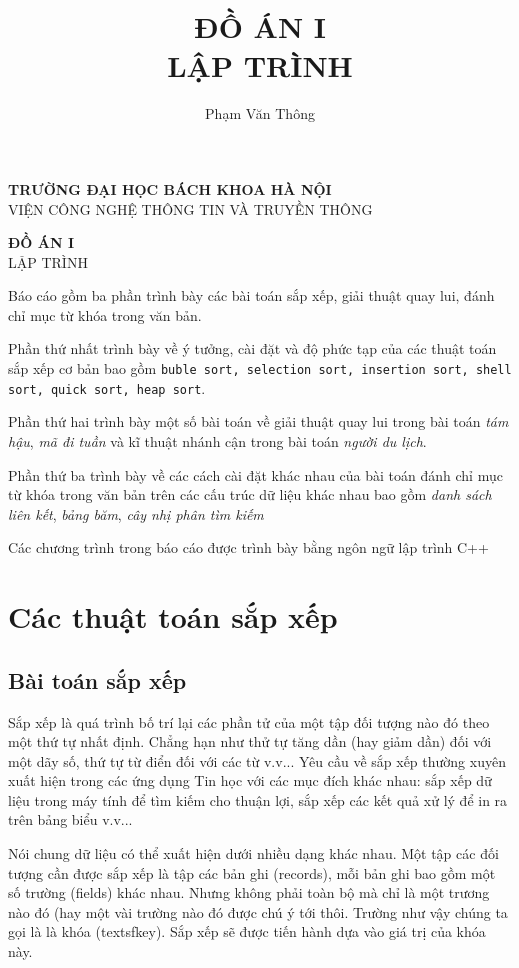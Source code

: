 \documentclass[8pt, a4paper]{article}
\title{\textbf{\huge{ĐỒ ÁN I}}\\ \large{\textsc{LẬP TRÌNH}}}
\author{Phạm Văn Thông}
\date{}
\begin{document}
\begin{center}
\textbf{\Large{TRƯỜNG ĐẠI HỌC BÁCH KHOA HÀ NỘI}}\\
\textsc{VIỆN CÔNG NGHỆ THÔNG TIN VÀ TRUYỀN THÔNG}

\vspace{2cm}

\textbf{\Huge{ĐỒ ÁN I}} \\ \LARGE{\textsc{LẬP TRÌNH}}
\author{}
\end{center}

\newpage
\abstract
Báo cáo gồm ba phần trình bày các bài toán sắp xếp, giải thuật quay lui, đánh chỉ mục từ khóa trong văn bản. 

Phần thứ nhất trình bày về ý tưởng, cài đặt và độ phức tạp của các thuật toán sắp xếp cơ bản bao gồm \texttt{buble sort, selection sort, insertion sort, shell sort, quick sort, heap sort}. 

Phần thứ hai trình bày một số bài toán về giải thuật quay lui trong bài toán \emph{tám hậu}, \emph{mã đi tuần} và kĩ thuật nhánh cận trong bài toán \emph{người du lịch}. 

Phần thứ ba trình bày về các cách cài đặt khác nhau của bài toán đánh chỉ mục từ khóa trong văn bản trên các cấu trúc dữ liệu khác nhau bao gồm \emph{danh sách liên kết}, \emph{bảng băm}, \emph{cây nhị phân tìm kiếm}

Các chương trình trong báo cáo được trình bày bằng ngôn ngữ lập trình C++
\section{Các thuật toán sắp xếp}
\subsection{Bài toán sắp xếp}

Sắp xếp là quá trình bố trí lại các phần tử của một tập đối tượng nào đó theo một thứ tự nhất định. Chẳng hạn như thử tự tăng dần (hay giảm dần) đối với một dãy số, thứ tự từ điển đối với các từ v.v... Yêu cầu về sắp xếp thường xuyên xuất hiện trong các ứng dụng Tin học với các mục đích khác nhau: sắp xếp dữ liệu trong máy tính để tìm kiếm cho thuận lợi, sắp xếp các kết quả xử lý để in ra trên bảng biểu v.v...

Nói chung dữ liệu có thể xuất hiện dưới nhiều dạng khác nhau. Một tập các đối tượng cần được sắp xếp là tập các bản ghi (records), mỗi bản ghi bao gồm một số trường (fields) khác nhau. Nhưng không phải toàn bộ mà chỉ là một trương nào đó (hay một vài trường nào đó được chú ý tới thôi. Trường như vậy chúng ta gọi là là \textsf{khóa} (textsf{key}). Sắp xếp sẽ được tiến hành dựa vào giá trị của khóa này.\\
\end{document}
